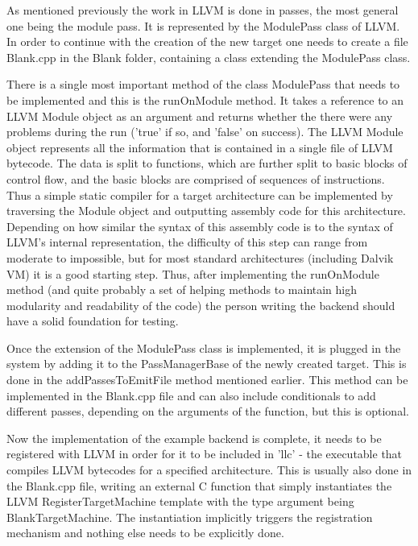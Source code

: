 \documentclass[parskip]{cs4rep}
\begin{document}
As mentioned previously the work in LLVM is done in passes, the most general one being the module pass. It is represented by the ModulePass class of LLVM. In order to continue with the creation of the new target one needs to create a file Blank.cpp in the Blank folder, containing a class extending the ModulePass class.

There is a single most important method of the class ModulePass that needs to be implemented and this is the runOnModule method. It takes a reference to an LLVM Module object as an argument and returns whether the there were any problems during the run ('true' if so, and 'false' on success). The LLVM Module object represents all the information that is contained in a single file of LLVM bytecode. The data is split to functions, which are further split to basic blocks of control flow, and the basic blocks are comprised of sequences of instructions. Thus a simple static compiler for a target architecture  can be implemented by traversing the Module object and outputting assembly code for this architecture. Depending on how similar the syntax of this assembly code is to the syntax of LLVM's internal representation, the difficulty of this step can range from moderate to impossible, but for most standard architectures (including Dalvik VM) it is a good starting step. Thus, after implementing the runOnModule method (and quite probably a set of helping methods to maintain high modularity and readability of the code) the person writing the backend should have a solid foundation for testing.

Once the extension of the ModulePass class is implemented, it is plugged in the system by adding it to the PassManagerBase of the newly created target. This is done in the addPassesToEmitFile method mentioned earlier. This method can be implemented in the Blank.cpp file and can also include conditionals to add different passes, depending on the arguments of the function, but this is optional.

Now the implementation of the example backend is complete, it needs to be registered with LLVM in order for it to be included in 'llc' - the executable that compiles LLVM bytecodes for a specified architecture. This is usually also done in the Blank.cpp file, writing an external C function that simply instantiates the LLVM RegisterTargetMachine template with the type argument being BlankTargetMachine. The instantiation implicitly triggers the registration mechanism and nothing else needs to be explicitly done.
\end{document}
